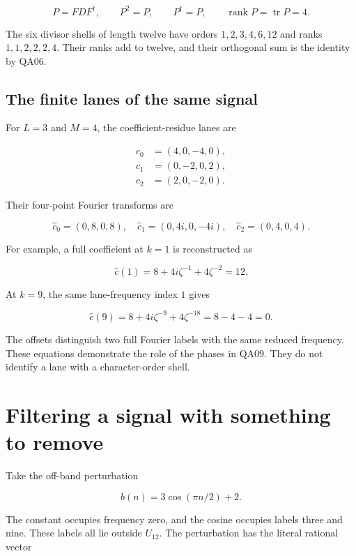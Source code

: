 \[
P=FDF^\dagger,
\qquad P^2=P,
\qquad P^\dagger=P,
\qquad \operatorname{rank}P=\operatorname{tr}P=4.
\]

The six divisor shells of length twelve have orders \(1,2,3,4,6,12\) and
ranks \(1,1,2,2,2,4\). Their ranks add to twelve, and their orthogonal
sum is the identity by QA06.

\hypertarget{q:the-finite-lanes-of-the-same-signal}{%
\subsection{The finite lanes of the same
signal}\label{q:the-finite-lanes-of-the-same-signal}}

For \(L=3\) and \(M=4\), the coefficient-residue lanes are

\[
\begin{aligned}
c_0&=(4,0,-4,0),\\
c_1&=(0,-2,0,2),\\
c_2&=(2,0,-2,0).
\end{aligned}
\]

Their four-point Fourier transforms are

\[
\widehat c_0=(0,8,0,8),
\quad \widehat c_1=(0,4i,0,-4i),
\quad \widehat c_2=(0,4,0,4).
\]

For example, a full coefficient at \(k=1\) is reconstructed as

\[
\widehat c(1)=8+4i\zeta^{-1}+4\zeta^{-2}=12.
\]

At \(k=9\), the same lane-frequency index \(1\) gives

\[
\widehat c(9)=8+4i\zeta^{-9}+4\zeta^{-18}=8-4-4=0.
\]

The offsets distinguish two full Fourier labels with the same reduced
frequency. These equations demonstrate the role of the phases in QA09.
They do not identify a lane with a character-order shell.

\hypertarget{q:filtering-a-signal-with-something-to-remove}{%
\section{Filtering a signal with something to
remove}\label{q:filtering-a-signal-with-something-to-remove}}

Take the off-band perturbation

\[
b(n)=3\cos(\pi n/2)+2.
\]

The constant occupies frequency zero, and the cosine occupies labels
three and nine. These labels all lie outside \(U_{12}\). The
perturbation has the literal rational vector

